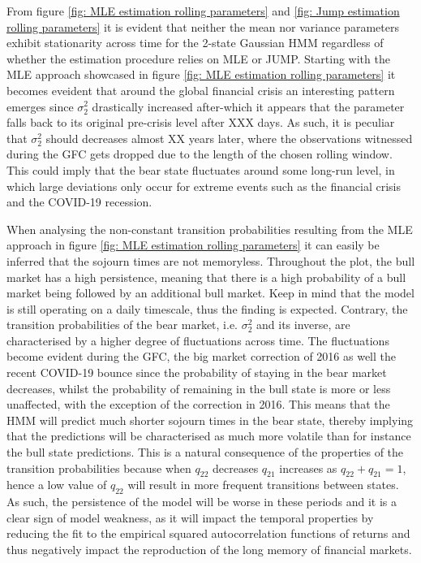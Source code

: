 From figure \ref{fig: MLE estimation rolling parameters} and \ref{fig: Jump estimation rolling parameters} it is evident that neither the mean nor variance parameters exhibit stationarity across time
for the 2-state Gaussian HMM regardless of whether the estimation procedure relies on MLE or JUMP. Starting with the MLE approach showcased in figure \ref{fig: MLE estimation rolling parameters} it becomes eveident that around the global financial crisis an interesting pattern emerges since $\sigma_2^2$ drastically increased after-which it appears that the parameter falls back to its original pre-crisis level after XXX days. As such, it is peculiar that $\sigma_2^2$ should decreases almost XX years later, where the observations witnessed during the GFC gets dropped due to the length of the chosen rolling window. This could imply that the bear state fluctuates around some long-run level, in which large deviations only occur for extreme events such as the financial crisis and the COVID-19 recession. 

When analysing the non-constant transition probabilities resulting from the MLE approach in figure \ref{fig: MLE estimation rolling parameters} it can easily be inferred that the sojourn times are not memoryless. Throughout the plot, the bull market has a high persistence, meaning that there is a high probability of a bull market being followed by an additional bull market. Keep in mind that the model is still operating on a daily timescale, thus the finding is expected. Contrary, the transition probabilities of the bear market, i.e. $\sigma_2^2$ and its inverse, are characterised by a higher degree of fluctuations across time. The fluctuations become evident during the GFC, the big market correction of 2016 as well the recent COVID-19 bounce since the probability of staying in the bear market decreases, whilst the probability of remaining in the bull state is more or less unaffected, with the exception of the correction in 2016. This means that the HMM will predict much shorter sojourn times in the bear state, thereby implying that the predictions will be characterised as much more volatile than for instance the bull state predictions. This is a natural consequence of the properties of the transition probabilities because when $q_{22}$ decreases $q_{21}$ increases as $q_{22} + q_{21} = 1$, hence a low value of $q_{22}$ will result in more frequent transitions between states. As such, the persistence of the model will be worse in these periods and it is a clear sign of model weakness, as it will impact the temporal properties by reducing the fit to the empirical squared autocorrelation functions of returns and thus negatively impact the reproduction of the long memory of financial markets. 

